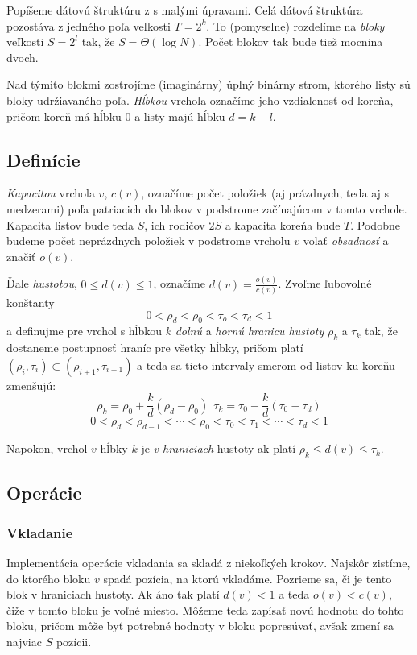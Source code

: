 Popíšeme dátovú štruktúru z \citep{btreeshort} s malými úpravami. Celá dátová štruktúra pozostáva z jedného poľa veľkosti $T = 2^k$. To (pomyselne) rozdelíme na \emph{bloky} veľkosti $S = 2^l$ tak, že $S=\Theta(\log{N})$. Počet blokov tak bude tiež mocnina dvoch.

Nad týmito blokmi zostrojíme (imaginárny) úplný binárny strom, ktorého listy sú bloky udržiavaného poľa. \emph{Hĺbkou} vrchola označíme jeho vzdialenosť od koreňa, pričom koreň má hĺbku $0$ a listy majú hĺbku $d = k-l$.

\subsection{Definície}

\emph{Kapacitou} vrchola $v$, $c(v)$, označíme počet položiek (aj prázdnych, teda aj s medzerami) poľa patriacich do blokov v podstrome začínajúcom v tomto vrchole. Kapacita listov bude teda $S$, ich rodičov $2S$ a kapacita koreňa bude $T$. Podobne budeme počet neprázdnych položiek v podstrome vrcholu $v$ volať \emph{obsadnosť} a značiť $o(v)$. 

Ďale \emph{hustotou}, $0 \le d(v) \le 1$, označíme $d(v) = \frac{o(v)}{c(v)}$. Zvoľme ľubovolné konštanty
\[
0 < \rho_d < \rho_0 < \tau_o < \tau_d < 1
\]
a definujme pre vrchol s hĺbkou $k$ \emph{dolnú} a \emph{hornú hranicu hustoty} $\rho_k$ a $\tau_k$ tak, že dostaneme postupnosť hraníc pre všetky hĺbky, pričom platí $(\rho_i,\tau_i) \subset (\rho_{i+1},\tau_{i+1})$ a teda sa tieto intervaly smerom od listov ku koreňu zmenšujú:
\[
\rho_k = \rho_0 + \frac{k}{d}(\rho_d-\rho_0) ~~
\tau_k = \tau_0 - \frac{k}{d}(\tau_0-\tau_d)
\]
\[
0 < \rho_d < \rho_{d-1} < \cdots < \rho_0 < \tau_0 < \tau_1 < \cdots < \tau_d < 1
\]

Napokon, vrchol $v$ hĺbky $k$ je \emph{v hraniciach} hustoty ak platí $\rho_k \le d(v) \le \tau_k$.

\subsection{Operácie}


\subsubsection{Vkladanie}

Implementácia operácie vkladania sa skladá z niekoľkých krokov. Najskôr zistíme, do ktorého bloku $v$ spadá pozícia, na ktorú vkladáme. Pozrieme sa, či je tento blok v hraniciach hustoty. Ak áno tak platí $d(v) < 1$ a teda $o(v) < c(v)$, čiže v tomto bloku je voľné miesto. Môžeme teda zapísať novú hodnotu do tohto bloku, pričom môže byť potrebné hodnoty v bloku popresúvať, avšak zmení sa najviac $S$ pozícii.

